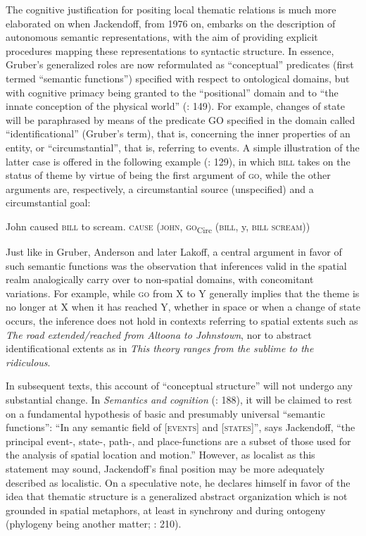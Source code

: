 \documentclass[output=paper]{langscibook}
\begin{document}
The cognitive justification for positing local thematic relations is much more elaborated on when Jackendoff, from 1976 on, embarks on the description of autonomous semantic representations, with the aim of providing explicit procedures mapping these representations to syntactic structure. In essence, Gruber’s generalized roles are now reformulated as “conceptual” predicates (first termed “semantic functions”) specified with respect to ontological domains, but with cognitive primacy being granted to the “positional” domain and to “the innate conception of the physical world” (\citeyear{jackendoff_toward_1976}: 149). For example, changes of state will be paraphrased by means of the predicate GO specified in the domain called “identificational” (Gruber’s term), that is, concerning the inner properties of an entity, or “circumstantial”, that is, referring to events. A simple illustration of the latter case is offered in the following example (\citeyear{jackendoff_toward_1976}: 129), in which \textsc{bill} takes on the status of theme by virtue of being the first argument of \textsc{go}, while the other arguments are, respectively, a circumstantial source (unspecified) and a circumstantial goal:

\ea
\ea John caused \textsc{bill} to scream.
\ex \textsc{cause} (\textsc{john}, \textsc{go}\textsubscript{Circ} (\textsc{bill}, y, \textsc{bill scream}))
\z
\z

Just like in Gruber, Anderson and later Lakoff, a central argument in favor of such semantic functions was the observation that inferences valid in the spatial realm analogically carry over to non-spatial domains, with concomitant variations. For example, while \textsc{go} from X to Y generally implies that the theme is no longer at X when it has reached Y, whether in space or when a change of state occurs, the inference does not hold in contexts referring to spatial extents such as \textit{The road extended\slash reached from Altoona to Johnstown}, nor to abstract identificational extents as in \textit{This theory ranges from the sublime to the ridiculous}.

In subsequent texts, this account of “conceptual structure” will not undergo any substantial change. In \textit{Semantics and cognition} (\citeyear{jackendoff_semantics_1983}: 188), it will be claimed to rest on a fundamental hypothesis of basic and presumably universal “semantic functions”: “In any semantic field of [\textsc{events}] and [\textsc{states}]”, says Jackendoff, “the principal event-, state-, path-, and place-functions are a subset of those used for the analysis of spatial location and motion.” However, as localist as this statement may sound, Jackendoff’s final position may be more adequately described as localistic. On a speculative note, he declares himself in favor of the idea that thematic structure is a generalized abstract organization which is not grounded in spatial metaphors, at least in synchrony and during ontogeny (phylogeny being another matter; \citeyear{jackendoff_semantics_1983}: 210). 
\end{document}
